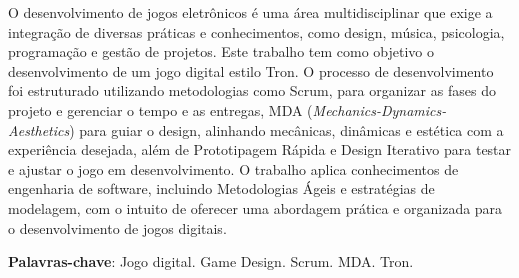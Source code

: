 \begin{resumo}
O desenvolvimento de jogos eletrônicos é uma área multidisciplinar que exige a integração de diversas práticas e conhecimentos, como design, música, psicologia, programação e gestão de projetos. Este trabalho tem como objetivo o desenvolvimento de um jogo digital estilo Tron. O processo de desenvolvimento foi estruturado utilizando metodologias como Scrum, para organizar as fases do projeto e gerenciar o tempo e as entregas, MDA (\textit{Mechanics-Dynamics-Aesthetics}) para guiar o design, alinhando mecânicas, dinâmicas e estética com a experiência desejada, além de Prototipagem Rápida e Design Iterativo para testar e ajustar o jogo em desenvolvimento. O trabalho aplica conhecimentos de engenharia de software, incluindo Metodologias Ágeis e estratégias de modelagem, com o intuito de oferecer uma abordagem prática e organizada para o desenvolvimento de jogos digitais.

\vspace{\onelineskip}

\noindent
\textbf{Palavras-chave}: Jogo digital. Game Design. Scrum. MDA. Tron.
\end{resumo}
